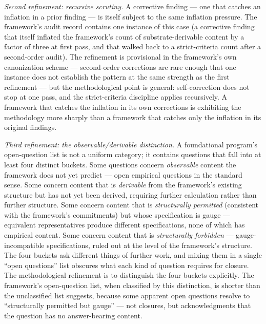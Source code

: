 \documentclass[
]{article}
\begin{document}
\emph{Second refinement: recursive scrutiny.} A corrective finding ---
one that catches an inflation in a prior finding --- is itself subject
to the same inflation pressure. The framework's audit record contains
one instance of this case (a corrective finding that itself inflated the
framework's count of substrate-derivable content by a factor of three at
first pass, and that walked back to a strict-criteria count after a
second-order audit). The refinement is provisional in the framework's
own canonization scheme --- second-order corrections are rare enough
that one instance does not establish the pattern at the same strength as
the first refinement --- but the methodological point is general:
self-correction does not stop at one pass, and the strict-criteria
discipline applies recursively. A framework that catches the inflation
in its own corrections is exhibiting the methodology more sharply than a
framework that catches only the inflation in its original findings.

\emph{Third refinement: the observable/derivable distinction.} A
foundational program's open-question list is not a uniform category; it
contains questions that fall into at least four distinct buckets. Some
questions concern \emph{observable} content the framework does not yet
predict --- open empirical questions in the standard sense. Some concern
content that is \emph{derivable} from the framework's existing structure
but has not yet been derived, requiring further calculation rather than
further structure. Some concern content that is \emph{structurally
permitted} (consistent with the framework's commitments) but whose
specification is gauge --- equivalent representatives produce different
specifications, none of which has empirical content. Some concern
content that is \emph{structurally forbidden} --- gauge-incompatible
specifications, ruled out at the level of the framework's structure. The
four buckets ask different things of further work, and mixing them in a
single ``open questions'' list obscures what each kind of question
requires for closure. The methodological refinement is to distinguish
the four buckets explicitly. The framework's open-question list, when
classified by this distinction, is shorter than the unclassified list
suggests, because some apparent open questions resolve to ``structurally
permitted but gauge'' --- not closures, but acknowledgments that the
question has no answer-bearing content.
\end{document}
